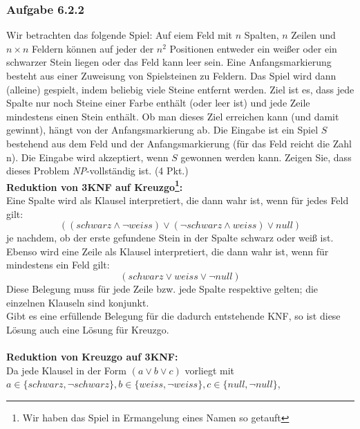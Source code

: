 \documentclass{article}
\newcommand{\sss}[1]{
	\addcontentsline{toc}{subsubsection}{Aufgabe #1}
	\subsubsection*{Aufgabe #1}
	\label{sssec:#1}
}
\begin{document}
\sss{6.2.2}
Wir betrachten das folgende Spiel: Auf eiem Feld mit $n$ Spalten, $n$ Zeilen und $n \times n $ Feldern können auf jeder der $n^2$ Positionen entweder ein weißer oder ein schwarzer Stein liegen oder das Feld kann leer sein.
Eine Anfangsmarkierung besteht aus einer Zuweisung von Spielsteinen zu Feldern.
Das Spiel wird dann (alleine) gespielt, indem beliebig viele Steine entfernt werden.
Ziel ist es, dass jede Spalte nur noch Steine einer Farbe enthält (oder leer ist) und jede Zeile mindestens einen Stein enthält.
Ob man dieses Ziel erreichen kann (und damit gewinnt), hängt von der Anfangsmarkierung ab.
Die Eingabe ist ein Spiel $S$ bestehend aus dem Feld und der Anfangsmarkierung (für das Feld reicht die Zahl n).
Die Eingabe wird akzeptiert, wenn $S$ gewonnen werden kann.
Zeigen Sie, dass dieses Problem \textit{NP}-vollständig ist. (4 Pkt.)
\vspace{1cm}\-\\
\textbf{Reduktion von 3KNF auf Kreuzgo\footnote{Wir haben das Spiel in Ermangelung eines Namen so getauft}:}\\
Eine Spalte wird als Klausel interpretiert, die dann wahr ist, wenn für jedes Feld gilt:
\[
    ((schwarz \land \lnot weiss) \lor (\lnot schwarz \land weiss) \lor null)
\]
je nachdem, ob der erste gefundene Stein in der Spalte schwarz oder weiß ist.\\
Ebenso wird eine Zeile als Klausel interpretiert, die dann wahr ist, wenn für mindestens ein Feld gilt:
\[
    (schwarz \lor weiss \lor \lnot null)
\]
Diese Belegung muss für jede Zeile bzw. jede Spalte respektive gelten; die einzelnen Klauseln sind konjunkt.\\
Gibt es eine erfüllende Belegung für die dadurch entstehende KNF, so ist diese Lösung auch eine Lösung für Kreuzgo.\\
\vspace{1cm}\\
\textbf{Reduktion von Kreuzgo auf 3KNF:}\\
Da jede Klausel in der Form $(a \lor b \lor c)$ vorliegt mit $a \in \{schwarz, \lnot schwarz\}, b \in \{weiss, \lnot weiss\}, c \in \{null, \lnot null\}$, 
\end{document}
